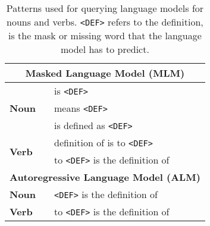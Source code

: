 \documentclass[11pt,a4paper]{article}
\begin{document}
\begin{table}
\centering
\begin{tabular}{ll}
\multicolumn{2}{c}{\textbf{Masked Language Model (MLM)}} \\\hline
\multirow{3}{*}{\textbf{Noun}} & \underline{\hspace{3mm}} is \texttt{<DEF>} \\
 & \underline{\hspace{3mm}} means \texttt{<DEF>}  \\%
& \underline{\hspace{3mm}} is defined as \texttt{<DEF>} \\\hline
 \multirow{2}{*}{\textbf{Verb}} & definition of \underline{\hspace{3mm}} is to \texttt{<DEF>} \\
 & to \texttt{<DEF>} is the definition of \underline{\hspace{3mm}}  \\ \hline\hline
 \multicolumn{2}{c}{\textbf{Autoregressive Language Model (ALM)}}\\ \hline
\multirow{1}{*}{\textbf{Noun}} & \texttt{<DEF>} is the definition of \underline{\hspace{3mm}} \\
  \hline %
 \multirow{1}{*}{\textbf{Verb}} &   to \texttt{<DEF>} is the definition of \underline{\hspace{3mm}} \\
\end{tabular}
\caption{Patterns used for querying language models for
  nouns and verbs.
\texttt{<DEF>} refers to the definition,
\underline{\hspace{3mm}} is the mask or missing word that
the language model has to predict.}
\label{tab:patterns}
\end{table}
\end{document}
